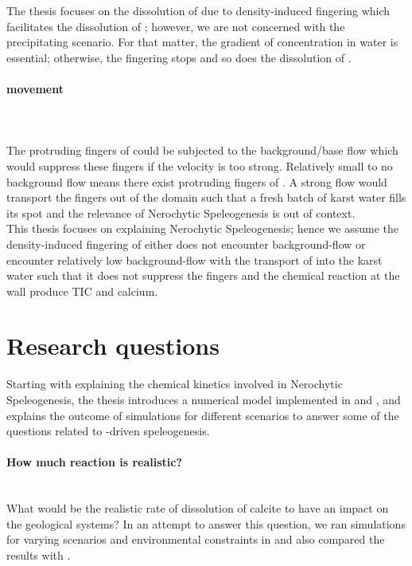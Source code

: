 The thesis focuses on the dissolution of  due to density-induced fingering which facilitates the dissolution of ; 
however, we are not concerned with the precipitating scenario. For that matter, the gradient of  concentration in water is essential; otherwise, the fingering 
stops and so does the dissolution of .

\newpage
\paragraph*{ movement}\mbox{}\\ \\
The protruding fingers of  could be subjected to the background/base flow which would suppress these fingers if the velocity is too strong. 
Relatively small to no background flow means there exist protruding fingers of . A strong flow would transport the fingers out 
of the domain such that a fresh batch of karst water fills its spot and the relevance of Nerochytic Speleogenesis is out of context. \\

This thesis focuses on explaining Nerochytic Speleogenesis; hence we assume the density-induced fingering of  either does not encounter 
background-flow or encounter relatively low background-flow with the transport of  into the karst water such that it does not suppress 
the fingers and the chemical reaction at the wall produce TIC and calcium.

\section {Research questions}
Starting with explaining the chemical kinetics involved in Nerochytic Speleogenesis, the thesis introduces a numerical model 
implemented in \DuMuX and \MATLAB , and explains the outcome of simulations for different scenarios to answer some of the questions 
related to -driven speleogenesis.\\

\paragraph*{How much reaction is realistic?} \mbox{}\\ 
What would be the realistic rate of dissolution of calcite to have an impact 
on the geological systems? In an attempt to answer this question, we ran simulations for varying scenarios and environmental constraints in \DuMuX and
also compared the results with \MATLAB. 

